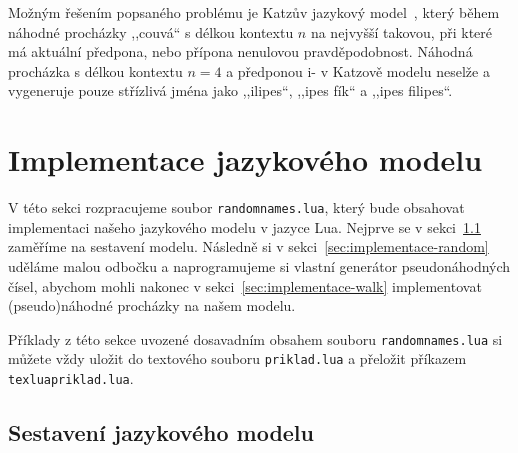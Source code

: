 \documentclass{csbulletin}
\newcommand\vref[1]{\ref{#1} na straně~\pageref{#1}}
\let\vref=\ref
\begin{document}
Možným řešením popsaného problému je Katzův jazykový model~\cite{katz1987estimation}, který během náhodné procházky ,,couvá`` s délkou kontextu $n$ na nejvyšší takovou, při které má aktuální předpona, nebo přípona nenulovou pravděpodobnost. Náhodná procházka s délkou kontextu $n=4$ a předponou i- v Katzově modelu neselže a vygeneruje pouze střízlivá jména jako ,,ilipes``, ,,ipes fík`` a ,,ipes filipes``.

\section{Implementace jazykového modelu}
\label{sec:implementace}

V této sekci rozpracujeme soubor \texttt{randomnames.lua}, který bude obsahovat implementaci našeho jazykového modelu v jazyce Lua. Nejprve se v sekci~\ref{sec:implementace-model} zaměříme na sestavení modelu. Následně si v sekci~\vref{sec:implementace-random} uděláme malou odbočku a naprogramujeme si vlastní generátor pseudonáhodných čísel, abychom mohli nakonec v sekci~\vref{sec:implementace-walk} implementovat (pseudo)náhodné procházky na našem modelu.

Příklady z této sekce uvozené dosavadním obsahem souboru \texttt{randomnames.lua} si můžete vždy uložit do textového souboru \texttt{priklad.lua} a přeložit příkazem \texttt{texlua\textvisiblespace priklad.lua}.

\subsection{Sestavení jazykového modelu}
\label{sec:implementace-model}
\end{document}
